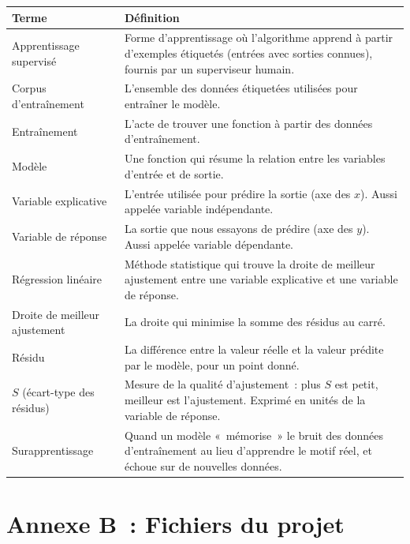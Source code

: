 \documentclass[12pt,a4paper]{article}
\begin{document}
\begin{center}
\begin{tabularx}{\textwidth}{l X}
  \toprule
  \textbf{Terme} & \textbf{Définition} \\
  \midrule
  Apprentissage supervisé & Forme d'apprentissage où l'algorithme apprend à partir d'exemples étiquetés (entrées avec sorties connues), fournis par un superviseur humain. \\
  Corpus d'entraînement & L'ensemble des données étiquetées utilisées pour entraîner le modèle. \\
  Entraînement & L'acte de trouver une fonction à partir des données d'entraînement. \\
  Modèle & Une fonction qui résume la relation entre les variables d'entrée et de sortie. \\
  Variable explicative & L'entrée utilisée pour prédire la sortie (axe des $x$). Aussi appelée variable indépendante. \\
  Variable de réponse & La sortie que nous essayons de prédire (axe des $y$). Aussi appelée variable dépendante. \\
  Régression linéaire & Méthode statistique qui trouve la droite de meilleur ajustement entre une variable explicative et une variable de réponse. \\
  Droite de meilleur ajustement & La droite qui minimise la somme des résidus au carré. \\
  Résidu & La différence entre la valeur réelle et la valeur prédite par le modèle, pour un point donné. \\
  $S$ (écart-type des résidus) & Mesure de la qualité d'ajustement~: plus $S$ est petit, meilleur est l'ajustement. Exprimé en unités de la variable de réponse. \\
  Surapprentissage & Quand un modèle «~mémorise~» le bruit des données d'entraînement au lieu d'apprendre le motif réel, et échoue sur de nouvelles données. \\
  \bottomrule
\end{tabularx}
\end{center}

\section*{Annexe B~: Fichiers du projet}
\end{document}

